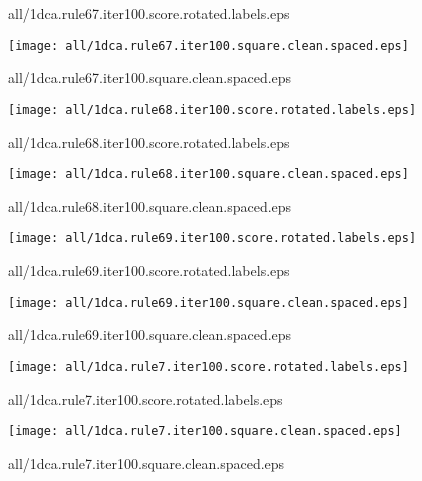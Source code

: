 \documentclass{article}
\begin{document}
{\footnotesize all/1dca.rule67.iter100.score.rotated.labels.eps}
\begin{center}
\begin{minipage}{\textwidth}
\texttt{[image: all/1dca.rule67.iter100.square.clean.spaced.eps]}
\end{minipage}
\end{center}
{\footnotesize all/1dca.rule67.iter100.square.clean.spaced.eps}
\begin{center}
\begin{minipage}{\textwidth}
\texttt{[image: all/1dca.rule68.iter100.score.rotated.labels.eps]}
\end{minipage}
\end{center}
{\footnotesize all/1dca.rule68.iter100.score.rotated.labels.eps}
\begin{center}
\begin{minipage}{\textwidth}
\texttt{[image: all/1dca.rule68.iter100.square.clean.spaced.eps]}
\end{minipage}
\end{center}
{\footnotesize all/1dca.rule68.iter100.square.clean.spaced.eps}
\begin{center}
\begin{minipage}{\textwidth}
\texttt{[image: all/1dca.rule69.iter100.score.rotated.labels.eps]}
\end{minipage}
\end{center}
{\footnotesize all/1dca.rule69.iter100.score.rotated.labels.eps}
\begin{center}
\begin{minipage}{\textwidth}
\texttt{[image: all/1dca.rule69.iter100.square.clean.spaced.eps]}
\end{minipage}
\end{center}
{\footnotesize all/1dca.rule69.iter100.square.clean.spaced.eps}
\begin{center}
\begin{minipage}{\textwidth}
\texttt{[image: all/1dca.rule7.iter100.score.rotated.labels.eps]}
\end{minipage}
\end{center}
{\footnotesize all/1dca.rule7.iter100.score.rotated.labels.eps}
\begin{center}
\begin{minipage}{\textwidth}
\texttt{[image: all/1dca.rule7.iter100.square.clean.spaced.eps]}
\end{minipage}
\end{center}
{\footnotesize all/1dca.rule7.iter100.square.clean.spaced.eps}
\end{document}
